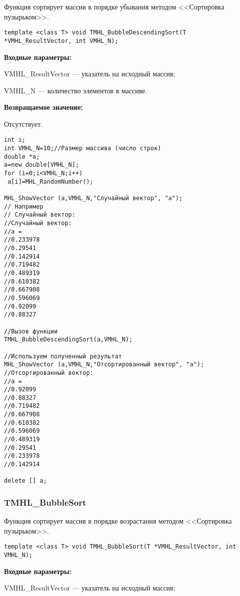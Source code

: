 \documentclass[a4paper,12pt]{article}
\begin{document}
Функция сортирует массив в порядке убывания методом <<Сортировка пузырьком>>.


\begin{lstlisting}[label=code_syntax_TMHL_BubbleDescendingSort,caption=Синтаксис]
template <class T> void TMHL_BubbleDescendingSort(T *VMHL_ResultVector, int VMHL_N);
\end{lstlisting}

\textbf{Входные параметры:}
 
VMHL\_ResultVector --- указатель на исходный массив;
 
VMHL\_N --- количество элементов в массиве.

\textbf{Возвращаемое значение:}

Отсутствует.


\begin{lstlisting}[label=code_use_TMHL_BubbleDescendingSort,caption=Пример использования]
int i;
int VMHL_N=10;//Размер массива (число строк)
double *a;
a=new double[VMHL_N];
for (i=0;i<VMHL_N;i++)
 a[i]=MHL_RandomNumber();

MHL_ShowVector (a,VMHL_N,"Случайный вектор", "a");
// Например
// Случайный вектор:
//Случайный вектор:
//a =
//0.233978
//0.29541
//0.142914
//0.719482
//0.489319
//0.610382
//0.667908
//0.596069
//0.92099
//0.88327

//Вызов функции
TMHL_BubbleDescendingSort(a,VMHL_N);

//Используем полученный результат
MHL_ShowVector (a,VMHL_N,"Отсортированный вектор", "a");
//Отсортированный вектор:
//a =
//0.92099
//0.88327
//0.719482
//0.667908
//0.610382
//0.596069
//0.489319
//0.29541
//0.233978
//0.142914

delete [] a;
\end{lstlisting}

\subsubsection{TMHL\_BubbleSort}\label{TMHL_BubbleSort}

Функция сортирует массив в порядке возрастания методом <<Сортировка пузырьком>>.


\begin{lstlisting}[label=code_syntax_TMHL_BubbleSort,caption=Синтаксис]
template <class T> void TMHL_BubbleSort(T *VMHL_ResultVector, int VMHL_N);
\end{lstlisting}

\textbf{Входные параметры:}
 
VMHL\_ResultVector --- указатель на исходный массив;
 
\end{document}
